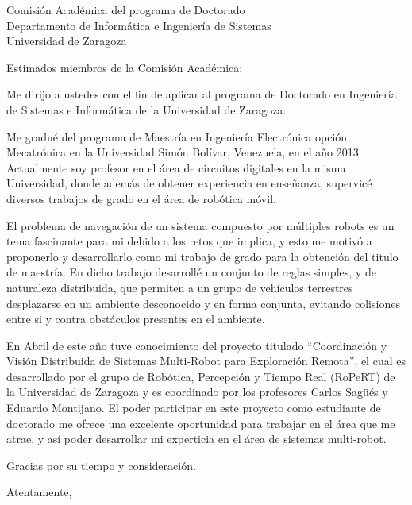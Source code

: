\documentclass[10pt]{letter}
\begin{document}
\begin{letter}{Comisión Académica del programa de Doctorado\\
    Departamento de Informática e Ingeniería de Sistemas\\
    Universidad de Zaragoza}

\opening{Estimados miembros de la Comisión Académica:}

Me dirijo a ustedes con el fin de aplicar al programa de Doctorado en
Ingeniería de Sistemas e Informática de la Universidad de Zaragoza.

Me gradué del programa de Maestría en Ingeniería Electrónica opción
Mecatrónica en la Universidad Simón Bolívar, Venezuela, en el año 2013.
Actualmente soy profesor en el área de circuitos digitales en la misma
Universidad, donde además de obtener experiencia en enseñanza, supervicé
diversos trabajos de grado en el área de robótica móvil.

El problema de navegación de un sistema compuesto por múltiples robots es un
tema fascinante para mi debido a los retos que implica, y esto me motivó a
proponerlo y desarrollarlo como mi trabajo de grado para la obtención del titulo
de maestría. En dicho trabajo desarrollé un conjunto de reglas simples, y de
naturaleza distribuida, que permiten a un grupo de vehículos terrestres
desplazarse en un ambiente desconocido y en forma conjunta,
evitando colisiones entre si y contra obstáculos presentes en el ambiente.

En Abril de este año tuve conocimiento del proyecto titulado
``Coordinación y Visión Distribuida de Sistemas Multi-Robot para Exploración
Remota'', el cual es desarrollado por el grupo de Robótica, Percepción y Tiempo
Real (RoPeRT) de la Universidad de Zaragoza y es coordinado por los profesores
Carlos Sagüés y Eduardo Montijano. El poder participar en este proyecto como
estudiante de doctorado me ofrece una excelente oportunidad para trabajar en el
área que me atrae, y así poder desarrollar mi experticia en el área de sistemas
multi-robot.

Gracias por su tiempo y consideración.

\closing{Atentamente,}


\end{letter}
\end{document}
